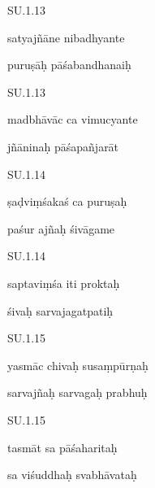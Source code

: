\documentclass{article}
\begin{document}

    
	
	    
		SU.1.13 
    
	    
		satyajñāne nibadhyante 
    
	    
		puruṣāḥ pāśabandhanaiḥ 
    

    
	
	    
		SU.1.13 
    
	    
		madbhāvāc ca vimucyante 
    
	    
		jñāninaḥ pāśapañjarāt 
    

    
	
	    
		SU.1.14 
    
	    
		ṣaḍviṃśakaś ca puruṣaḥ 
    
	    
		paśur ajñaḥ śivāgame 
    

    
	
	    
		SU.1.14 
    
	    
		saptaviṃśa iti proktaḥ 
    
	    
		śivaḥ sarvajagatpatiḥ 
    

    
	
	    
		SU.1.15 
    
	    
		yasmāc chivaḥ susaṃpūrṇaḥ 
    
	    
		sarvajñaḥ sarvagaḥ prabhuḥ 
    

    
	
	    
		SU.1.15 
    
	    
		tasmāt sa pāśaharitaḥ 
    
	    
		sa viśuddhaḥ svabhāvataḥ 
    

    
	
\end{document}
